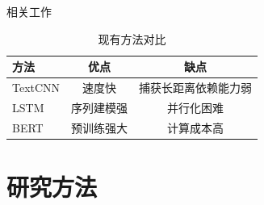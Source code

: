 \documentclass[aspectratio=169]{beamer}
\begin{document}
\begin{frame}{相关工作}
  \begin{table}
    \centering
    \small
    \begin{tabular}{lcc}
      \toprule
      方法 & 优点 & 缺点 \\
      \midrule
      TextCNN & 速度快 & 捕获长距离依赖能力弱 \\
      LSTM & 序列建模强 & 并行化困难 \\
      BERT & 预训练强大 & 计算成本高 \\
      \bottomrule
    \end{tabular}
    \caption{现有方法对比}
  \end{table}
\end{frame}

\section{研究方法}
\end{document}
